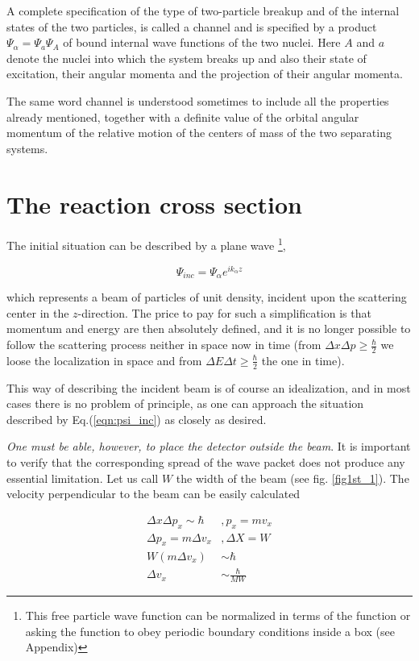 A complete specification of the type of two-particle breakup and of the internal states of the two particles, is called a channel and is specified by a product $\Psi_{\alpha} = \Psi_a \Psi_A$ of bound internal wave functions of the two nuclei. Here $A$ and $a$ denote the nuclei into which the system breaks up and also their state of excitation, their angular momenta and the projection of their angular momenta.

The same word channel is understood sometimes to include all the properties already mentioned, together with a definite value of the orbital angular momentum of the relative motion of the centers of mass of the two separating systems.


\section{The reaction cross section}

The initial situation can be described by a plane wave \footnote{This free particle wave function can be normalized in terms of the function or asking the function to obey periodic boundary conditions inside a box (see Appendix)},

\begin{equation}
\Psi_{inc} = \Psi_{\alpha} e^{i k_{\alpha} z}
\label{eqn:psi_inc}
\end{equation}

\noindent which represents a beam of particles of unit density, incident upon the scattering center in the $z$-direction. The price to pay for such a simplification is that momentum and energy are then absolutely defined, and it is no longer possible to follow the scattering process neither in space now in time (from $\Delta x \Delta p \ge \frac{\hbar}{2}$ we loose the localization in space and from $\Delta E \Delta t \ge \frac{\hbar}{2}$ the one in time).

This way of describing the incident beam is of course an idealization, and in most cases there is no problem of principle, as one can approach the situation described by Eq.(\ref{eqn:psi_inc}) as closely as desired.

{\it One must be able, however, to place the detector outside the beam}. It is important to verify that the corresponding spread of the wave packet does not produce any essential limitation. Let us call $W$ the width of the beam (see fig. \ref{fig1st_1}). The velocity perpendicular to the beam can be easily calculated

\begin{equation}
\begin{array}{rl}
\Delta x \Delta p_x \sim \hbar &, p_x = m v_x \\
\Delta p_x = m \Delta v_x &, \Delta X = W \\
W(m \Delta v_x) &\sim \hbar \\
\Delta v_x &\sim \frac{\hbar}{MW}
\end{array}
\label{eqn:10}
\end{equation}

